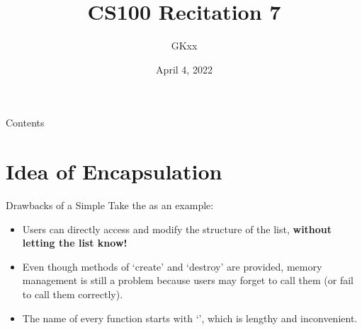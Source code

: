 \documentclass{beamer}
\title{CS100 Recitation 7}
\author{GKxx}
\date{April 4, 2022}
\begin{document}
\begin{frame}
    \maketitle
\end{frame}

\begin{frame}{Contents}
    \tableofcontents
\end{frame}

\section{Idea of Encapsulation}

\begin{frame}{Drawbacks of a Simple \struct}
    Take the  as an example:
    \begin{itemize}
        \item Users can directly access and modify the structure of the list, \textbf{without letting the list know!}
        \item Even though methods of `create' and `destroy' are provided, memory management is still a problem because users may forget to call them (or fail to call them correctly).
        \item The name of every function starts with `', which is lengthy and inconvenient.
    \end{itemize}
\end{frame}
\end{document}
